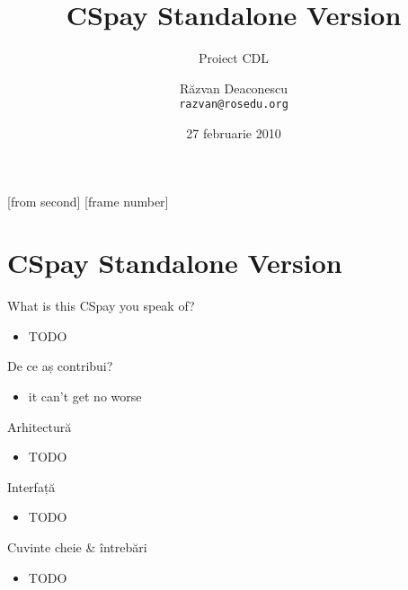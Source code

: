 \documentclass{beamer}
\title[CSpay]{CSpay Standalone Version}
\subtitle{Proiect CDL}
\institute[ROSEdu]{ROSEdu}
\author[Răzvan Deaconescu]{Răzvan Deaconescu \\ \texttt{razvan@rosedu.org}}
\date{27 februarie 2010}
\begin{document}
[from second]
[frame number]

\frame{\titlepage}

\section{CSpay Standalone Version}

\begin{frame}{What is this CSpay you speak of?}
    \begin{itemize}
	\item TODO
    \end{itemize}
\end{frame}

\begin{frame}{De ce aș contribui?}
    \begin{itemize}
	\item it can't get no worse
    \end{itemize}
\end{frame}

\begin{frame}{Arhitectură}
    \begin{itemize}
	\item TODO
    \end{itemize}
\end{frame}

\begin{frame}{Interfață}
    \begin{itemize}
	\item TODO
    \end{itemize}
\end{frame}

\begin{frame}{Cuvinte cheie \& întrebări}
    \begin{itemize}
	\item TODO
    \end{itemize}
\end{frame}
\end{document}
